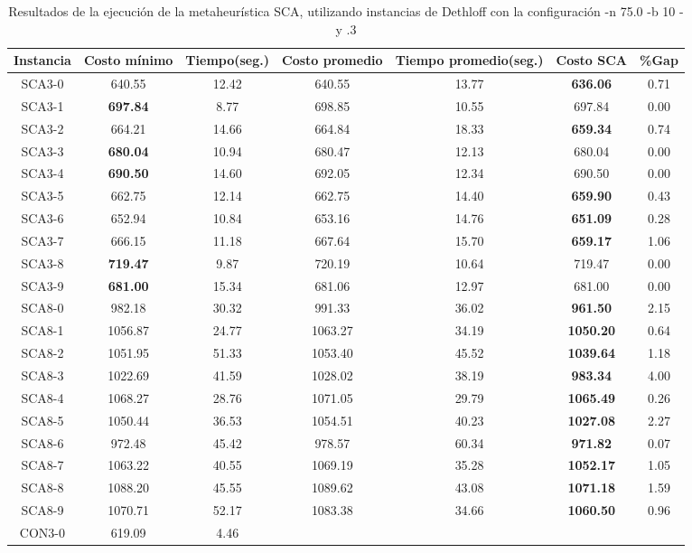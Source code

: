 \begin{table}[ht]
\caption{Resultados de la ejecución de la metaheurística SCA, utilizando instancias de Dethloff con la configuración -n 75.0 -b 10 -y .3}
\centering
\small
\begin{tabular}{c c c c c c c}
\hline\hline
Instancia & Costo mínimo & Tiempo(seg.) & Costo promedio & Tiempo promedio(seg.) & Costo SCA & \%Gap \\ [0.5ex]
\hline
SCA3-0 & 640.55 & 12.42 & 
640.55 & 13.77 & \bf{636.06} & 
0.71\\SCA3-1 & \bf{697.84} & 8.77 & 
698.85 & 10.55 & 697.84 & 0.00\\
SCA3-2 & 664.21 & 14.66 & 
664.84 & 18.33 & \bf{659.34} & 
0.74\\SCA3-3 & \bf{680.04} & 10.94 & 
680.47 & 12.13 & 680.04 & 0.00\\
SCA3-4 & \bf{690.50} & 14.60 & 
692.05 & 12.34 & 690.50 & 0.00\\
SCA3-5 & 662.75 & 12.14 & 
662.75 & 14.40 & \bf{659.90} & 
0.43\\SCA3-6 & 652.94 & 10.84 & 
653.16 & 14.76 & \bf{651.09} & 
0.28\\SCA3-7 & 666.15 & 11.18 & 
667.64 & 15.70 & \bf{659.17} & 
1.06\\SCA3-8 & \bf{719.47} & 9.87 & 
720.19 & 10.64 & 719.47 & 0.00\\
SCA3-9 & \bf{681.00} & 15.34 & 
681.06 & 12.97 & 681.00 & 0.00\\
SCA8-0 & 982.18 & 30.32 & 
991.33 & 36.02 & \bf{961.50} & 
2.15\\SCA8-1 & 1056.87 & 24.77 & 
1063.27 & 34.19 & \bf{1050.20} & 
0.64\\SCA8-2 & 1051.95 & 51.33 & 
1053.40 & 45.52 & \bf{1039.64} & 
1.18\\SCA8-3 & 1022.69 & 41.59 & 
1028.02 & 38.19 & \bf{983.34} & 
4.00\\SCA8-4 & 1068.27 & 28.76 & 
1071.05 & 29.79 & \bf{1065.49} & 
0.26\\SCA8-5 & 1050.44 & 36.53 & 
1054.51 & 40.23 & \bf{1027.08} & 
2.27\\SCA8-6 & 972.48 & 45.42 & 
978.57 & 60.34 & \bf{971.82} & 
0.07\\SCA8-7 & 1063.22 & 40.55 & 
1069.19 & 35.28 & \bf{1052.17} & 
1.05\\SCA8-8 & 1088.20 & 45.55 & 
1089.62 & 43.08 & \bf{1071.18} & 
1.59\\SCA8-9 & 1070.71 & 52.17 & 
1083.38 & 34.66 & \bf{1060.50} & 
0.96\\CON3-0 & 619.09 & 4.46 & 

\end{tabular}
\end{table}
